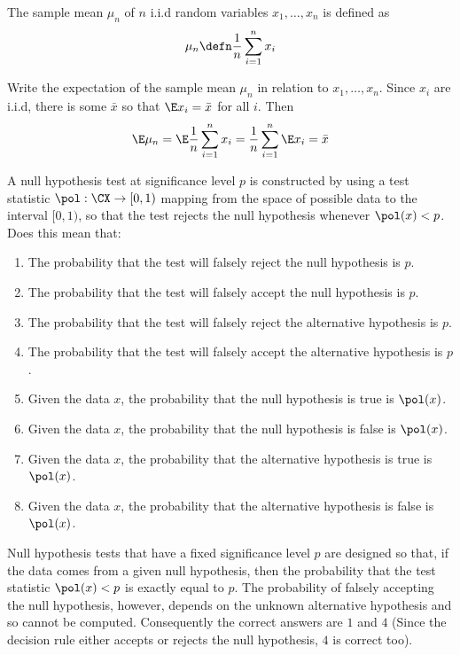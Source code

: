 \documentclass[a4paper]{article}
\def\solution {0}
\begin{document}
\begin{exercise}
  The sample mean $\mu_n$ of $n$  i.i.d random variables $x_1, \ldots, x_n$ is defined as
  \[
  \mu_n \defn
  \ifdefined \solution
  \frac{1}{n} \sum_{i=1}^n x_i
  \else
  \ldots 
  \fi
  \]
\end{exercise}

\begin{exercise}
  Write the expectation of the sample mean $\mu_n$ in relation to $x_1, \ldots, x_n$.
  \ifdefined \solution
  Since $x_i$ are i.i.d, there is some $\bar{x}$ so that $\E x_i = \bar{x}$ for all $i$. Then
  \fi
  \[
  \E \mu_n =
  \ifdefined \solution
  \E \frac{1}{n} \sum_{i=1}^n x_i
  = \frac{1}{n} \sum_{i=1}^n \E x_i = \bar{x}
  \else
  \ldots
  \fi
  \]

\end{exercise}

\begin{exercise}
  A null hypothesis test at significance level $p$ is constructed by using a test statistic $\pol: \CX \to [0,1)$ mapping from the space of possible data to the interval $[0,1)$, so that the test rejects the null hypothesis whenever $\pol(x) < p$. Does this mean that:
  \begin{enumerate}
  \item The probability that the test will falsely reject the null hypothesis is $p$.
  \item The probability that the test will falsely accept the null hypothesis is $p$.
  \item The probability that the test will falsely reject the alternative hypothesis is $p$.
  \item The probability that the test will falsely accept the alternative hypothesis is $p$.
  \item Given the data $x$, the probability that the null hypothesis is true is $\pol(x)$.
  \item Given the data $x$, the probability that the null hypothesis is false is $\pol(x)$.
  \item Given the data $x$, the probability that the alternative hypothesis is true is $\pol(x)$.
  \item Given the data $x$, the probability that the alternative hypothesis is false is $\pol(x)$.
  \end{enumerate}
  \end{exercise}
  \ifdefined \solution
  Null hypothesis tests that have a fixed significance level $p$ are designed so that, if the data comes from a given null hypothesis, then the probability that the test statistic $\pol(x) < p$ is exactly equal to $p$. The probability of falsely accepting the null hypothesis, however, depends on the unknown alternative hypothesis and so cannot be computed. Consequently the correct answers are $1$ and $4$ (Since the decision rule either accepts or rejects the null hypothesis, $4$ is correct too).
  \fi
\end{document}
